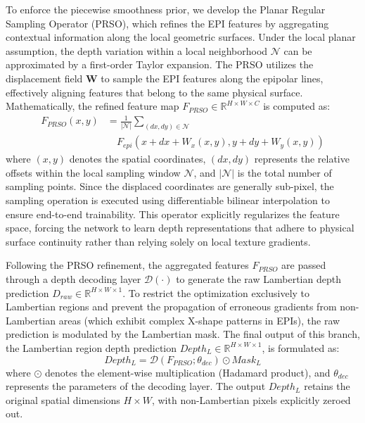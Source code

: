 \documentclass[lettersize,journal]{IEEEtran}
\begin{document}
To enforce the piecewise smoothness prior, we develop the Planar Regular Sampling Operator (PRSO), which refines the EPI features by aggregating contextual information along the local geometric surfaces. Under the local planar assumption, the depth variation within a local neighborhood $\mathcal{N}$ can be approximated by a first-order Taylor expansion. The PRSO utilizes the displacement field $\mathbf{W}$ to sample the EPI features along the epipolar lines, effectively aligning features that belong to the same physical surface. Mathematically, the refined feature map $F_{PRSO} \in \mathbb{R}^{H \times W \times C}$ is computed as:
\begin{equation}
\begin{aligned}
F_{PRSO}(x,y) &= \frac{1}{|\mathcal{N}|} \sum_{(dx,dy) \in \mathcal{N}} \\
&\quad F_{epi}\left(x + dx + W_x(x,y), y + dy + W_y(x,y)\right)
\end{aligned}
\end{equation}
where $(x,y)$ denotes the spatial coordinates, $(dx,dy)$ represents the relative offsets within the local sampling window $\mathcal{N}$, and $|\mathcal{N}|$ is the total number of sampling points. Since the displaced coordinates are generally sub-pixel, the sampling operation is executed using differentiable bilinear interpolation to ensure end-to-end trainability. This operator explicitly regularizes the feature space, forcing the network to learn depth representations that adhere to physical surface continuity rather than relying solely on local texture gradients.

Following the PRSO refinement, the aggregated features $F_{PRSO}$ are passed through a depth decoding layer $\mathcal{D}(\cdot)$ to generate the raw Lambertian depth prediction $D_{raw} \in \mathbb{R}^{H \times W \times 1}$. To restrict the optimization exclusively to Lambertian regions and prevent the propagation of erroneous gradients from non-Lambertian areas (which exhibit complex X-shape patterns in EPIs), the raw prediction is modulated by the Lambertian mask. The final output of this branch, the Lambertian region depth prediction $Depth_L \in \mathbb{R}^{H \times W \times 1}$, is formulated as:
\begin{equation}
Depth_L = \mathcal{D}(F_{PRSO}; \theta_{dec}) \odot Mask_L
\end{equation}
where $\odot$ denotes the element-wise multiplication (Hadamard product), and $\theta_{dec}$ represents the parameters of the decoding layer. The output $Depth_L$ retains the original spatial dimensions $H \times W$, with non-Lambertian pixels explicitly zeroed out.
\end{document}
